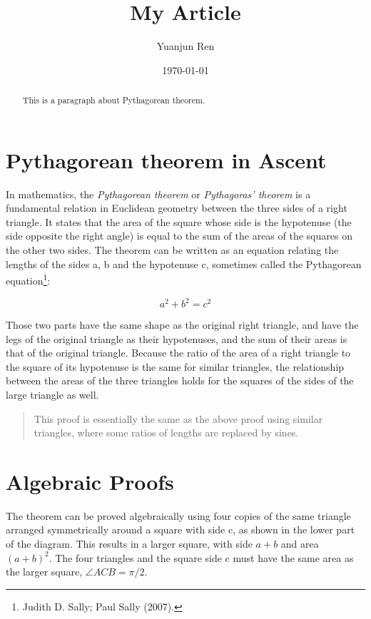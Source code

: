 \documentclass[11pt]{article}
\title{My Article}
\author{Yuanjun Ren}
\date{\today}
\newenvironment{myquote}
    {\begin{quote}}
    {\end{quote}}
\begin{document}
\maketitle

\begin{abstract}
    This is a paragraph about Pythagorean theorem.
\end{abstract}

\newpage

\tableofcontents
\newpage

\section{Pythagorean theorem in Ascent}
In mathematics, the \emph{Pythagorean theorem} or \emph{Pythagoras' theorem} is a fundamental relation in Euclidean geometry between the three sides of a right triangle. It states that the area of the square whose side is the hypotenuse (the side opposite the right angle) is equal to the sum of the areas of the squares on the other two sides. The theorem can be written as an equation relating the lengths of the sides a, b and the hypotenuse c, sometimes called the Pythagorean equation\footnote{Judith D. Sally; Paul Sally (2007).}:

$$
a^2 + b^2 = c^2
$$

Those two parts have the same shape as the original right triangle, and have the legs of the original triangle as their hypotenuses, and the sum of their areas is that of the original triangle. Because the ratio of the area of a right triangle to the square of its hypotenuse is the same for similar triangles, the relationship between the areas of the three triangles holds for the squares of the sides of the large triangle as well.

\begin{myquote}
This proof is essentially the same as the above proof using similar triangles, where some ratios of lengths are replaced by sines.
\end{myquote}


\section{Algebraic Proofs}
The theorem can be proved algebraically using four copies of the same triangle arranged symmetrically around a square with side c, as shown in the lower part of the diagram\cite{Kline}. This results in a larger square, with side $a + b$ and area $(a + b)^2$. The four triangles and the square side c must have the same area as the larger square, $\angle ACB = \pi / 2$.
\end{document}

